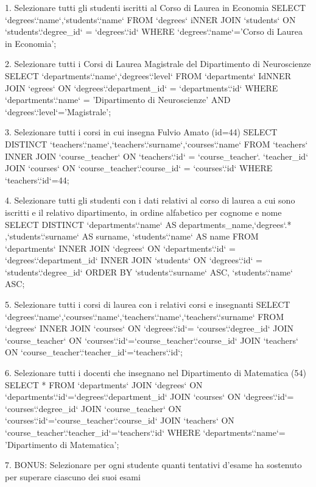 1. Selezionare tutti gli studenti iscritti al Corso di Laurea in Economia
SELECT `degrees`.`name`,`students`.`name` FROM `degrees` iNNER JOIN `students` ON `students`.`degree_id` = `degrees`.`id` WHERE `degrees`.`name`='Corso di Laurea in Economia';


2. Selezionare tutti i Corsi di Laurea Magistrale del Dipartimento di Neuroscienze
SELECT `departments`.`name`,`degrees`.`level` FROM `departments` IdNNER JOIN `egrees` ON `degrees`.`department_id` = `departments`.`id` WHERE `departments`.`name` = 'Dipartimento di Neuroscienze' AND `degrees`.`level`='Magistrale';

3. Selezionare tutti i corsi in cui insegna Fulvio Amato (id=44)
SELECT DISTINCT `teachers`.`name`,`teachers`.`surname`,`courses`.`name` FROM `teachers` INNER JOIN `course_teacher` ON `teachers`.`id` = `course_teacher`. `teacher_id` JOIN `courses` ON `course_teacher`.`course_id` = `courses`.`id` WHERE `teachers`.`id`=44;

4. Selezionare tutti gli studenti con i dati relativi al corso di laurea a cui sono iscritti e il
relativo dipartimento, in ordine alfabetico per cognome e nome
SELECT DISTINCT `departments`.`name` AS departments_name,`degrees`.* ,`students`.`surname` AS surname, `students`.`name` AS name FROM `departments` INNER JOIN `degrees` ON `departments`.`id` = `degrees`.`department_id` INNER JOIN `students` ON `degrees`.`id` = `students`.`degree_id` ORDER BY `students`.`surname` ASC, `students`.`name` ASC;

5. Selezionare tutti i corsi di laurea con i relativi corsi e insegnanti
SELECT `degrees`.`name`,`courses`.`name`,`teachers`.`name`,`teachers`.`surname` FROM `degrees` INNER JOIN `courses` ON `degrees`.`id`= `courses`.`degree_id` JOIN `course_teacher` ON `courses`.`id`=`course_teacher`.`course_id` JOIN `teachers` ON `course_teacher`.`teacher_id`=`teachers`.`id`;


6. Selezionare tutti i docenti che insegnano nel Dipartimento di Matematica (54)
SELECT * FROM `departments` JOIN `degrees` ON `departments`.`id`=`degrees`.`department_id` JOIN `courses` ON `degrees`.`id`= `courses`.`degree_id` JOIN `course_teacher` ON `courses`.`id`=`course_teacher`.`course_id` JOIN `teachers` ON `course_teacher`.`teacher_id`=`teachers`.`id` WHERE `departments`.`name`= 'Dipartimento di Matematica';


7. BONUS: Selezionare per ogni studente quanti tentativi d’esame ha sostenuto per
superare ciascuno dei suoi esami